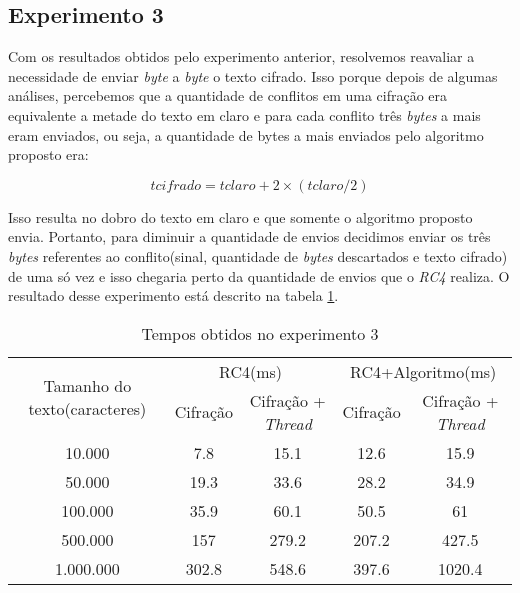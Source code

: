 \subsection{Experimento 3}

Com os resultados obtidos pelo experimento anterior, resolvemos reavaliar a necessidade de enviar \textit{byte} a \textit{byte} o texto cifrado. Isso porque depois de algumas análises, percebemos que a quantidade de conflitos em uma cifração era equivalente a metade do texto em claro e para cada conflito três \textit{bytes} a mais eram enviados, ou seja, a quantidade de bytes a mais enviados pelo algoritmo proposto era:

\begin{equation}
	tcifrado = tclaro + 2 \times (tclaro/2)
\end{equation}

Isso resulta no dobro do texto em claro e que somente o algoritmo proposto envia. Portanto, para diminuir a quantidade de envios decidimos enviar os três \textit{bytes} referentes ao conflito(sinal, quantidade de \textit{bytes} descartados e texto cifrado) de uma só vez e isso chegaria perto da quantidade de envios que o \textit{RC4} realiza. O resultado desse experimento está descrito na tabela \ref{results-experiment-3}.

\begin{table}[h]
\centering
\begin{tabular}{|c|c|c|c|c|}
\hline
\multirow{2}{3cm}{Tamanho do texto(caracteres)} & \multicolumn{2}{c|}{RC4(ms)}         & \multicolumn{2}{c|}{RC4+Algoritmo(ms)} \\ \cline{2-5} 
                                              & Cifração & Cifração + \textit{Thread} & Cifração  & Cifração + \textit{Thread}   \\ \hline
10.000                                        & 7.8      & 15.1                  & 12.6      & 15.9                   \\ \hline
50.000                                        & 19.3     & 33.6                  & 28.2      & 34.9                   \\ \hline
100.000                                       & 35.9     & 60.1                  & 50.5      & 61                     \\ \hline
500.000                                       & 157      & 279.2                 & 207.2     & 427.5                  \\ \hline
1.000.000                                     & 302.8    & 548.6                 & 397.6     & 1020.4                 \\ \hline
\end{tabular}
\caption{Tempos obtidos no experimento 3}
\label{results-experiment-3}
\end{table}

